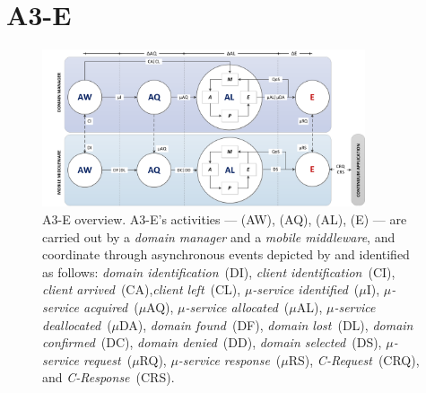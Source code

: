 \section{A3-E}\label{sec:A3-E}


\begin{figure}[tbp]
	\includegraphics[width=0.85\textwidth]{figs/A3-E}
	\caption{A3-E overview. A3-E's activities --- (AW), (AQ), (AL), (E) --- are carried out by a \textit{domain manager} and a \textit{mobile middleware}, and coordinate through asynchronous events depicted by and identified as follows: \textit{domain identification}~(DI), \textit{client identification}~(CI), \textit{client arrived}~(CA),\textit{client left}~(CL), \textit{$\mu$-service identified}~($\mu$I), \textit{$\mu$-service acquired}~($\mu$AQ), \textit{$\mu$-service allocated}~($\mu$AL), \textit{$\mu$-service deallocated}~($\mu$DA), \textit{domain found}~(DF), \textit{domain lost}~(DL), \textit{domain confirmed}~(DC), \textit{domain denied}~(DD), \textit{domain selected}~(DS), \textit{$\mu$-service request}~($\mu$RQ), \textit{$\mu$-service response}~($\mu$RS), \textit{C-Request}~(CRQ), and \textit{C-Response}~(CRS).}
	\label{fig:A3-E-process}
\end{figure}


